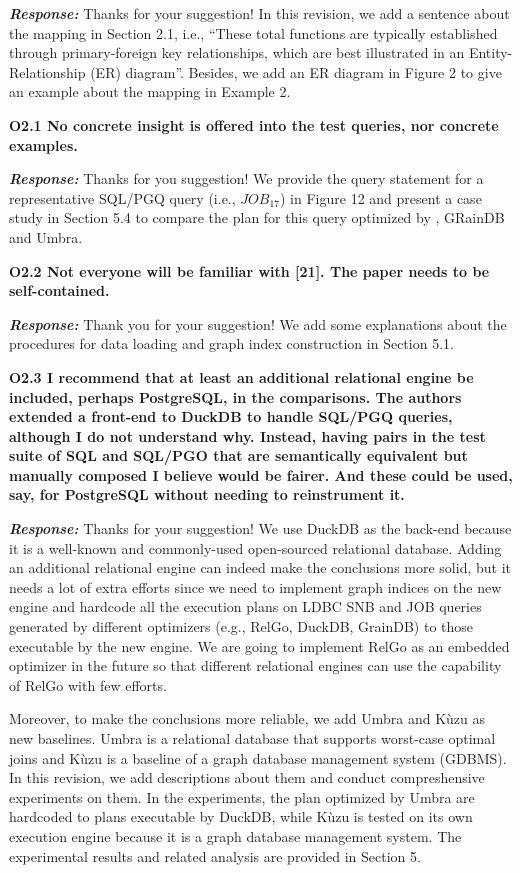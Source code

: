 \textbf{\textit{Response: }}
Thanks for your suggestion! 
In this revision, we add a sentence about the mapping in Section 2.1, i.e., ``These total functions are typically established through primary-foreign key relationships, which are best illustrated in an Entity-Relationship (ER) diagram''.
Besides, we add an ER diagram in Figure 2 to give an example about the mapping in Example 2. 


\textbf{O2.1 No concrete insight is offered into the test queries, nor concrete examples. }

\textbf{\textit{Response: }}
Thanks for you suggestion! We provide the query statement for a representative SQL/PGQ query (i.e., $JOB_{17}$) in Figure 12 and present a case study in Section 5.4 to compare the plan for this query optimized by \name, GRainDB and Umbra.




\textbf{
O2.2 Not everyone will be familiar with [21]. The paper needs to be self-contained. }

\textbf{\textit{Response: }}
Thank you for your suggestion! We add some explanations about the procedures for data loading and graph index construction in Section 5.1.

\textbf{ 
O2.3 I recommend that at least an additional relational engine be included, perhaps PostgreSQL, in the comparisons. The authors extended a front-end to DuckDB to handle SQL/PGQ queries, although I do not understand why. Instead, having pairs in the test suite of SQL and SQL/PGO that are semantically equivalent but manually composed I believe would be fairer. And these could be used, say, for PostgreSQL without needing to reinstrument it.}

\textbf{\textit{Response: }}
Thanks for your suggestion! 
We use DuckDB as the back-end because it is a well-known and commonly-used open-sourced relational database.
Adding an additional relational engine can indeed make the conclusions more solid, but it needs a lot of extra efforts since we need to implement graph indices on the new engine and hardcode all the execution plans on LDBC SNB and JOB queries generated by different optimizers (e.g., RelGo, DuckDB, GrainDB) to those executable by the new engine. We are going to implement RelGo as an embedded optimizer in the future so that different relational engines can use the capability of RelGo with few efforts.

Moreover, to make the conclusions more reliable, we add Umbra and K\`uzu as new baselines. Umbra is a relational database that supports worst-case optimal joins and K\`uzu is a baseline of a graph database management system (GDBMS).
In this revision, we add descriptions about them and conduct compreshensive experiments on them.
In the experiments, the plan optimized by Umbra are hardcoded to plans executable by DuckDB, while K\`uzu is tested on its own execution engine because it is a graph database management system.
The experimental results and related analysis are provided in Section 5. 


